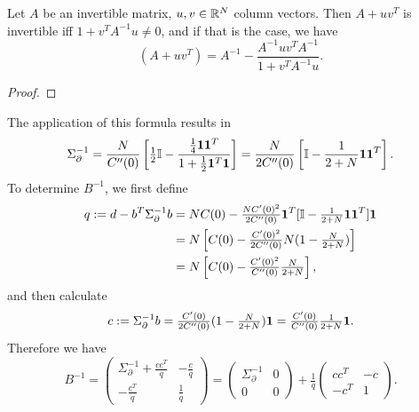 \begin{lemma}
	Let \(A\) be an invertible matrix, \(u,v\in\mathbb{R}^N\) column vectors.
	Then \(A+ uv^T\) is invertible iff \(1+v^T A^{-1}u \neq 0\), and if that is
	the case, we have
	\[
		(A+uv^T) = A^{-1} - \frac{A^{-1}u v^T A^{-1}}{1+v^T A^{-1}u}.
	\]
\end{lemma}
\begin{proof}
\end{proof}

The application of this formula results in
\begin{equation}\label{eq: sigma_partial inverse}
	\Sigma_\partial^{-1}
	= \frac{N}{C''(0)}\left[
		\tfrac12\mathbb{I} - \frac{\tfrac14\mathbf{1}\mathbf{1}^T}{1+\tfrac12\mathbf{1}^T\mathbf{1}}
	\right]
	= \frac{N}{2C''(0)}\left[
		\mathbb{I} - \frac{1}{2+N}\mathbf{1}\mathbf{1}^T
	\right].
\end{equation}
To determine \(B^{-1}\), we first define
\begin{align*}
	q := d - b^T \Sigma_\partial^{-1}b
	&= NC(0) - \tfrac{NC'(0)^2}{2C''(0)}\mathbf{1}^T
	[\mathbb{I}-\tfrac1{2+N}\mathbf{1}\mathbf{1}^T]\mathbf{1}\\
	&= N\left[
		C(0) - \tfrac{C'(0)^2}{2C''(0)}
		N( 1-\tfrac{N}{2+N} )
	\right]\\
	&= N\left[
		C(0) - \tfrac{C'(0)^2}{C''(0)}
		\tfrac{N}{2+N}
	\right],
\end{align*}
and then calculate
\begin{equation}\label{eq: definition of c=sigma_partial^{-1} b}
	c:=\Sigma_\partial^{-1}b
	= \tfrac{\sqC'(0)}{2\sqC''(0)}( 1 - \tfrac{\dimension}{2+\dimension} )\ones
	= \tfrac{\sqC'(0)}{\sqC''(0)}\tfrac{1}{2+\dimension}\ones.
\end{equation}
Therefore we have
\begin{equation}\label{eq: inv B split}
	B^{-1} = \begin{pmatrix}
		\Sigma_\partial^{-1}	+ \frac{cc^T}{q} & - \frac{c}{q}\\
		-\frac{c^T}{q} & \frac1q
	\end{pmatrix}
	= \begin{pmatrix}
		\Sigma_\partial^{-1} & 0 \\
		0 & 0
	\end{pmatrix}
	+ \tfrac1q \begin{pmatrix}
		cc^T & -c\\
		-c^T & 1
	\end{pmatrix}.
\end{equation}

